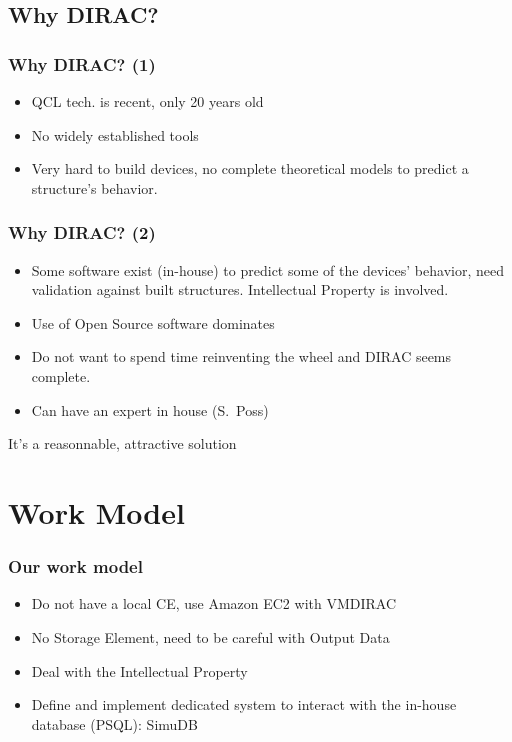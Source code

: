 \documentclass[14pt]{beamer}
\begin{document}
\subsection{Why DIRAC?}
\begin{frame}
\frametitle{Why DIRAC? (1)}
\begin{itemize}
\setlength{\itemindent}{-1.2em}
\item QCL tech. is recent, \alert{only 20 years old}
\item No widely established tools
\item \alert{Very hard to build devices}, no complete theoretical models to predict a structure's behavior.
\end{itemize}
\end{frame}

\begin{frame}
\frametitle{Why DIRAC? (2)}
\begin{itemize}
\setlength{\itemindent}{-1.2em}
\item Some software exist (in-house) to predict some of the devices' behavior, need validation against built structures. {\color{blue}Intellectual Property} is involved.
\item Use of Open Source software dominates
\item Do not want to spend time reinventing the wheel and DIRAC seems complete.
\item Can have an expert in house (S.~Poss)
\end{itemize}
\alert{It's a reasonnable, attractive solution}
\end{frame}


\section{Work Model}
\begin{frame}
\frametitle{Our work model}
\begin{itemize}
\setlength{\itemindent}{-1.2em}
\item Do not have a local CE, use \alert{Amazon EC2 with VMDIRAC}
\item {\color{blue}No Storage Element}, need to be careful with Output Data
\item Deal with the {\color{blue}Intellectual Property}
\item Define and implement \alert{dedicated system} to interact with the in-house database (PSQL): SimuDB
\end{itemize}
\end{frame}
\end{document}
